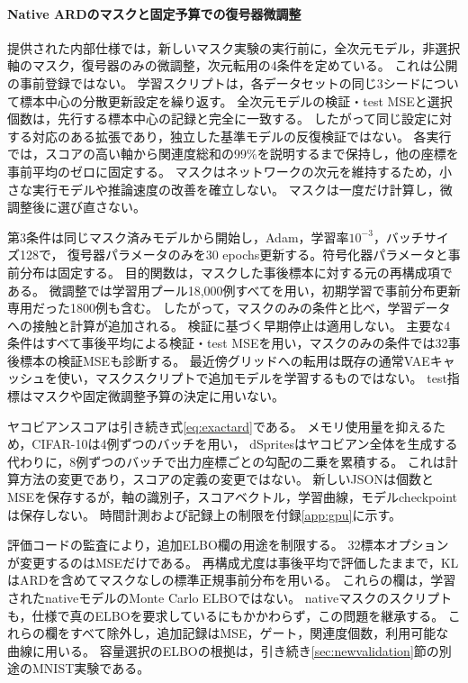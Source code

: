 \documentclass[11pt,a4paper]{ltjsarticle}
\begin{document}
\paragraph{Native ARDのマスクと固定予算での復号器微調整}
提供された内部仕様では，新しいマスク実験の実行前に，全次元モデル，非選択軸のマスク，復号器のみの微調整，次元転用の4条件を定めている。
これは公開の事前登録ではない。
学習スクリプトは，各データセットの同じ3シードについて標本中心の分散更新設定を繰り返す。
全次元モデルの検証・test MSEと選択個数は，先行する標本中心の記録と完全に一致する。
したがって同じ設定に対する対応のある拡張であり，独立した基準モデルの反復検証ではない。
各実行では，スコアの高い軸から関連度総和の99\%を説明するまで保持し，他の座標を事前平均のゼロに固定する。
マスクはネットワークの次元を維持するため，小さな実行モデルや推論速度の改善を確立しない。
マスクは一度だけ計算し，微調整後に選び直さない。

第3条件は同じマスク済みモデルから開始し，Adam，学習率$10^{-3}$，バッチサイズ128で，
復号器パラメータのみを30 epochs更新する。符号化器パラメータと事前分布は固定する。
目的関数は，マスクした事後標本に対する元の再構成項である。
微調整では学習用プール18,000例すべてを用い，初期学習で事前分布更新専用だった1800例も含む。
したがって，マスクのみの条件と比べ，学習データへの接触と計算が追加される。
検証に基づく早期停止は適用しない。
主要な4条件はすべて事後平均による検証・test MSEを用い，マスクのみの条件では32事後標本の検証MSEも診断する。
最近傍グリッドへの転用は既存の通常VAEキャッシュを使い，マスクスクリプトで追加モデルを学習するものではない。
test指標はマスクや固定微調整予算の決定に用いない。

ヤコビアンスコアは引き続き式\eqref{eq:exactard}である。
メモリ使用量を抑えるため，CIFAR-10は4例ずつのバッチを用い，
dSpritesはヤコビアン全体を生成する代わりに，8例ずつのバッチで出力座標ごとの勾配の二乗を累積する。
これは計算方法の変更であり，スコアの定義の変更ではない。
新しいJSONは個数とMSEを保存するが，軸の識別子，スコアベクトル，学習曲線，モデルcheckpointは保存しない。
時間計測および記録上の制限を付録\ref{app:gpu}に示す。

評価コードの監査により，追加ELBO欄の用途を制限する。
32標本オプションが変更するのはMSEだけである。
再構成尤度は事後平均で評価したままで，KLはARDを含めてマスクなしの標準正規事前分布を用いる。
これらの欄は，学習されたnativeモデルのMonte Carlo ELBOではない。
nativeマスクのスクリプトも，仕様で真のELBOを要求しているにもかかわらず，この問題を継承する。
これらの欄をすべて除外し，追加記録はMSE，ゲート，関連度個数，利用可能な曲線に用いる。
容量選択のELBOの根拠は，引き続き\ref{sec:newvalidation}節の別途のMNIST実験である。
\end{document}
